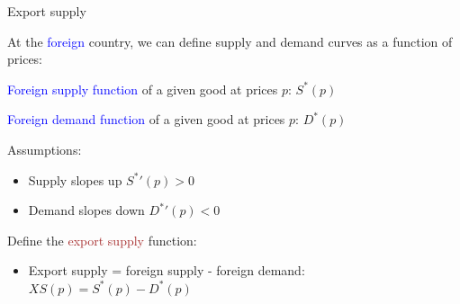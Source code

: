 \documentclass[notes,11pt, aspectratio=169, xcolor=table]{beamer}
\newcommand{\blue}[1]{\textcolor{blue}{#1}}
\newenvironment{wideitemize}{\itemize\addtolength{\itemsep}{10pt}}{\enditemize}
\begin{document}
\begin{frame}{Export supply}
\begin{wideitemize}
    \item At the \blue{foreign} country, we can define supply and demand curves as a function of prices:
    \item<2-> \blue{Foreign supply function} of a given good at prices $p$: $S^*(p)$
    \item<2-> \blue{Foreign demand function} of a given good at prices $p$: $D^*(p)$
    \item<3-> Assumptions:
    \begin{itemize}
        \item Supply slopes up ${S^*}'(p) > 0$
        \item Demand slopes down ${D^*}'(p) < 0$
    \end{itemize}
    \item<4-> Define the \textcolor{brown}{export supply} function:
    \begin{itemize}
        \item Export supply = foreign supply - foreign demand: $XS(p) = S^*(p) - D^*(p)$ 
    \end{itemize}
\end{wideitemize}
    
\end{frame}
\end{document}
